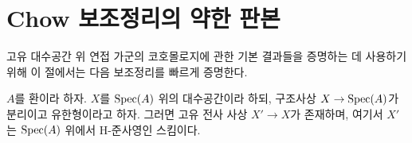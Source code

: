 







\section{Chow 보조정리의 약한 판본}
\label{section-weak-chow}

\noindent
고유 대수공간 위 연접 가군의 코호몰로지에 관한 기본 결과들을 증명하는
데 사용하기 위해 이 절에서는 다음 보조정리를 빠르게 증명한다.

\begin{lemma}
\label{lemma-weak-chow}
$A$를 환이라 하자. $X$를 $\mathop{\mathrm{Spec}}(A)$ 위의 대수공간이라 하되, 구조사상
$X \to \mathop{\mathrm{Spec}}(A)$가 분리이고 유한형이라고 하자. 그러면 고유 전사 사상
$X' \to X$가 존재하며, 여기서 $X'$는 $\mathop{\mathrm{Spec}}(A)$ 위에서
H-준사영인 스킴이다.
\end{lemma}

